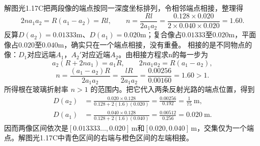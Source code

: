 \documentclass[UTF8,fontset=fandol,a4paper,11pt]{ctexart}
\begin{document}
解图光1.17C把两段像的端点按同一深度坐标排列，令相邻端点相接，整理得
\[
2na_1a_2=R(a_1-a_2)=Rl,
\qquad
\boxed{n=\frac{Rl}{2a_1a_2}
=\frac{0.128\times0.020}{2\times0.040\times0.020}
=1.60}.
\]
反算$D(a_2)=0.01333$m、$D(a_1)=0.020$m；复合像占$0.01333$至$0.020$m，平面像占$0.020$至$0.040$m，确实只在一个端点相接，没有重叠。
相接的是不同物点的像：$D_1$对应远端$A_1$，$A_2'$对应近端$A_2$。由相接方程求n的每一步为
\[
a_2(R+2na_1)=a_1R,\qquad
2na_1a_2=R(a_1-a_2),
\]
\[
n=\frac{(a_1-a_2)R}{2a_1a_2}
=\frac{lR}{2a_1a_2}
=\frac{0.00256}{0.00160}=1.60>1.
\]
所得根在玻璃折射率 $n>1$ 的范围内。把它代入两条反射光路的端点位置，得到
\[
\begin{aligned}
D(a_2)&=\frac{0.020\times0.128}{0.128+2(1.6)(0.020)}
=\frac{0.00256}{0.192}=\frac1{75}\ \mathrm m,\\
D(a_1)&=\frac{0.040\times0.128}{0.128+2(1.6)(0.040)}
=\frac{0.00512}{0.256}=0.020\ \mathrm m.
\end{aligned}
\]
因而两像区间依次是$[0.013333\ldots,0.020]\,\mathrm m$和$[0.020,0.040]\,\mathrm m$，交集仅为一个端点。解图光1.17C中青色区间的右端与橙色区间的左端相接。
\end{document}
